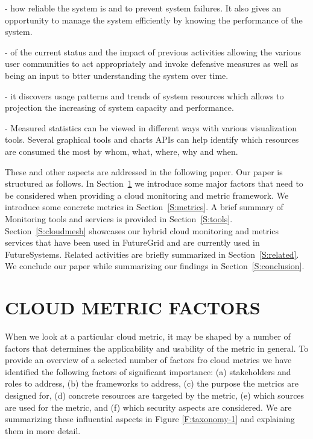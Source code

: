 \documentclass{sig-alternate-05-2015}
\begin{document}
\begin{description}
\setlength\itemsep{-2pt}

\item[\it Understanding] - how reliable the system is and to prevent system failures. It also gives an opportunity to manage the system efficiently by knowing the performance of the system.

\item[\it Getting informed] - of the current status and the impact of previous activities allowing the various user communities to act
  appropriately and invoke defensive measures as well as being an  input to btter understanding the system over time.

\item[\it Estimating future requests] - it discovers usage patterns and trends of system resources which allows to projection the increasing of system capacity and performance.

\item[\it Reporting] - Measured statistics can be viewed in different ways with various visualization tools. Several graphical tools and charts APIs can help identify which resources are consumed the most by whom, what, where, why and when.

\end{description}

These and other aspects are addressed in the following paper. Our paper is structured as follows. In Section~\ref{S:factors} we introduce some major factors that need to be considered when providing a cloud monitoring and metric framework. We introduce some concrete metrics in Section~\ref{S:metrics}.  A brief summary of Monitoring tools and services is provided in Section~\ref{S:tools}.  Section~\ref{S:cloudmesh} showcases our hybrid cloud monitoring and metrics services that have been used in FutureGrid and are currently used in FutureSystems. Related activities are briefly summarized in Section~\ref{S:related}.  We conclude our paper while summarizing our findings in Section~\ref{S:conclusion}.

\section{CLOUD METRIC FACTORS} \label {S:factors}

When we look at a particular cloud metric, it may be shaped by a number of factors that determines the applicability and usability of the metric in general. To provide an overview of a selected number of factors fro cloud metrics we have identified the following factors of significant importance: (a) stakeholders and roles to address, (b) the frameworks to address, (c) the purpose the metrics are designed for, (d) concrete resources are targeted by the metric, (e) which sources are used for the metric, and (f) which security aspects are considered. We are summarizing these influential aspects in Figure \ref{F:taxonomy-1} and explaining them in more detail.
\end{document}
